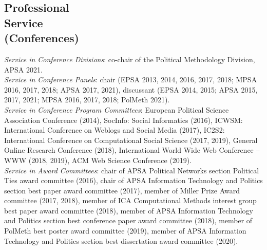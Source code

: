 \documentclass[margin,line,11pt]{resume}
\newcommand{\nl}{\vspace{0.10in}\\}
\begin{document}
\begin{resume}


\section{\mysidestyle Professional\\Service\\(Conferences)}

\emph{Service in Conference Divisions}: co-chair of the Political Methodology Division, APSA 2021.\nl
\emph{Service in Conference Panels}: chair (EPSA 2013, 2014, 2016, 2017, 2018; MPSA 2016, 2017, 2018; APSA 2017, 2021), discussant (EPSA 2014, 2015; APSA 2015, 2017, 2021; MPSA 2016, 2017, 2018; PolMeth 2021).\nl
\emph{Service in Conference Program Committees}: European Political Science Association Conference (2014), SocInfo: Social Informatics (2016), ICWSM: International Conference on Weblogs and Social Media (2017), IC2S2: International Conference on Computational Social Science (2017, 2019), General Online Research Conference (2018),  International World Wide Web Conference -- WWW (2018, 2019), ACM Web Science Conference (2019).\nl
\emph{Service in Award Committees}: chair of APSA Political Networks section Political Ties award committee (2016), chair of APSA Information Technology and Politics section best paper award committee (2017), member of Miller Prize Award committee (2017, 2018), member of ICA Computational Methods interest group best paper award committee (2018), member of APSA Information Technology and Politics section best conference paper award committee (2018), member of PolMeth best poster award committee (2019), member of APSA Information Technology and Politics section best dissertation award committee (2020).


\end{resume}
\end{document}
